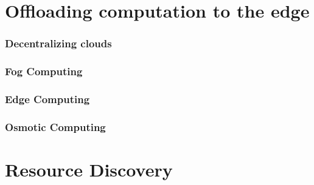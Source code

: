 \section{Offloading computation to the edge} 
\label{sec:offloading_comp}

\subsubsection{Decentralizing clouds}

\subsubsection{Fog Computing}

\subsubsection{Edge Computing}

\subsubsection{Osmotic Computing}

\section{Resource Discovery} 
\label{sec:res_discvovery}

